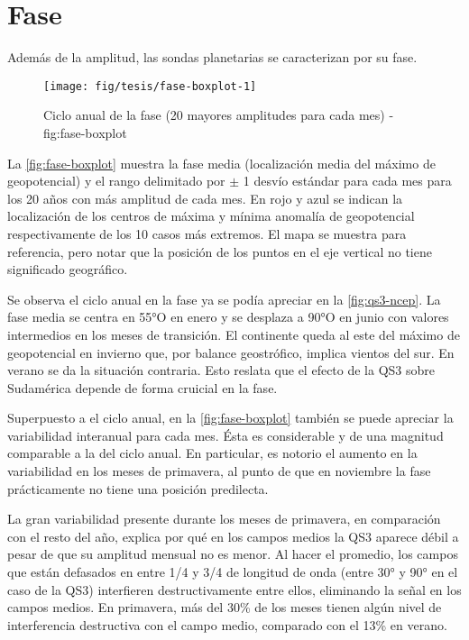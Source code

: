 \documentclass[spanish,a4paper,12p]{book}
\begin{document}
\section{Fase}\label{fase}

Además de la amplitud, las sondas planetarias se caracterizan por su
fase. 

\begin{landscape}\begin{figure}

{\centering \texttt{[image: fig/tesis/fase-boxplot-1]} 

}

\caption{Ciclo anual de la fase (20 mayores amplitudes para cada mes) - fig:fase-boxplot}\label{fig:fase-boxplot}
\end{figure}
\end{landscape}

La \autoref{fig:fase-boxplot} muestra la fase media (localización media
del máximo de geopotencial) y el rango delimitado por \(\pm\) 1 desvío
estándar para cada mes para los 20 años con más amplitud de cada mes. En
rojo y azul se indican la localización de los centros de máxima y mínima
anomalía de geopotencial respectivamente de los 10 casos más extremos.
El mapa se muestra para referencia, pero notar que la posición de los
puntos en el eje vertical no tiene significado geográfico.

Se observa el ciclo anual en la fase ya se podía apreciar en la
\autoref{fig:qs3-ncep}. La fase media se centra en 55°O en enero y se
desplaza a 90°O en junio con valores intermedios en los meses de
transición. El continente queda al este del máximo de geopotencial en
invierno que, por balance geostrófico, implica vientos del sur. En
verano se da la situación contraria. Esto reslata que el efecto de la
QS3 sobre Sudamérica depende de forma cruicial en la fase.

Superpuesto a el ciclo anual, en la \autoref{fig:fase-boxplot} también
se puede apreciar la variabilidad interanual para cada mes. Ésta es
considerable y de una magnitud comparable a la del ciclo anual. En
particular, es notorio el aumento en la variabilidad en los meses de
primavera, al punto de que en noviembre la fase prácticamente no tiene
una posición predilecta.

La gran variabilidad presente durante los meses de primavera, en
comparación con el resto del año, explica por qué en los campos medios
la QS3 aparece débil a pesar de que su amplitud mensual no es menor. Al
hacer el promedio, los campos que están defasados en entre 1/4 y 3/4 de
longitud de onda (entre 30° y 90° en el caso de la QS3) interfieren
destructivamente entre ellos, eliminando la señal en los campos medios.
En primavera, más del 30\% de los meses tienen algún nivel de
interferencia destructiva con el campo medio, comparado con el 13\% en
verano.
\end{document}
